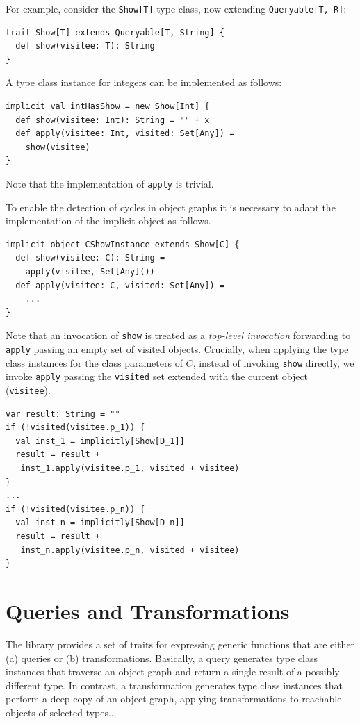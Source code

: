 \documentclass[preprint]{sigplanconf}
\begin{document}
For example, consider the \verb|Show[T]| type class, now extending
\verb|Queryable[T, R]|:
\begin{lstlisting}
trait Show[T] extends Queryable[T, String] {
  def show(visitee: T): String
}
\end{lstlisting}
\noindent
A type class instance for integers can be implemented as follows:
\begin{lstlisting}
implicit val intHasShow = new Show[Int] {
  def show(visitee: Int): String = "" + x
  def apply(visitee: Int, visited: Set[Any]) =
    show(visitee)
}
\end{lstlisting}
\noindent
Note that the implementation of \verb|apply| is trivial.

To enable the detection of cycles in object graphs it is necessary to
adapt the implementation of the implicit object as follows.

\begin{lstlisting}
implicit object CShowInstance extends Show[C] {
  def show(visitee: C): String =
    apply(visitee, Set[Any]())
  def apply(visitee: C, visited: Set[Any]) =
    ...
}
\end{lstlisting}
\noindent
Note that an invocation of \verb|show| is treated as a \emph{top-level
invocation} forwarding to \verb|apply| passing an empty set of visited
objects. Crucially, when applying the type class instances for the class
parameters of $C$, instead of invoking \verb|show| directly, we invoke
\verb|apply| passing the \verb|visited| set extended with the current object
(\verb|visitee|).

\begin{lstlisting}
var result: String = ""
if (!visited(visitee.p_1)) {
  val inst_1 = implicitly[Show[D_1]]
  result = result +
   inst_1.apply(visitee.p_1, visited + visitee)
}
...
if (!visited(visitee.p_n)) {
  val inst_n = implicitly[Show[D_n]]
  result = result +
   inst_n.apply(visitee.p_n, visited + visitee)
}
\end{lstlisting}
\noindent


\section{Queries and Transformations}\label{sec:queries-transformations}

The library provides a set of traits for expressing generic functions that are
either (a) queries or (b) transformations. Basically, a query generates type
class instances that traverse an object graph and return a single result of a
possibly different type. In contrast, a transformation generates type class
instances that perform a deep copy of an object graph, applying
transformations to reachable objects of selected types...
\end{document}

